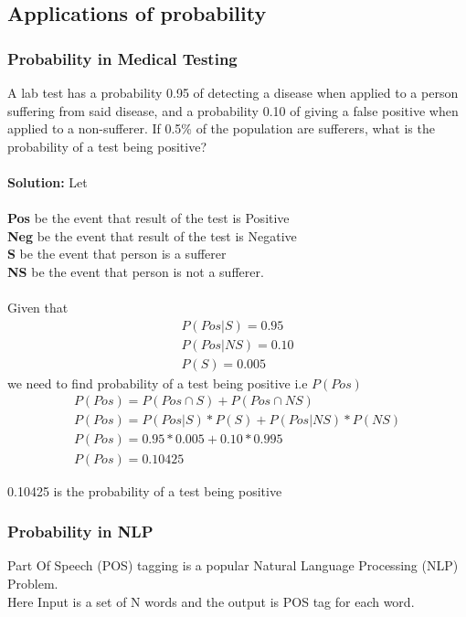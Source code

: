 \documentclass[12pt]{article}
\begin{document}
\subsection{Applications of probability}\subsubsection{Probability in Medical Testing}
A lab test has a probability 0.95 of detecting a disease when applied to a person suffering from said disease, and a probability 0.10 of giving a false positive when applied to a non-sufferer. If 0.5\% of the population are sufferers, what is the probability of a test being positive?\\ \\
\textbf{Solution:}
Let \\ \\
\textbf{Pos} be the event that result of the test is Positive\\ \textbf{Neg} be the event that result of the test is Negative\\
\textbf{S} be the event that person is a sufferer \\ 
\textbf{NS} be the event that person is not a sufferer. \\ \\
Given that
\begin{gather*}
    P(Pos|S) = 0.95\\
    P(Pos|NS) = 0.10\\
    P(S) = 0.005
\end{gather*}
we need to find probability of a test being positive i.e $P(Pos)$
\begin{gather*}
    P(Pos) = P(Pos\cap S) + P(Pos\cap NS)\\
    P(Pos) = P(Pos|S)*P(S) + P(Pos|NS)*P(NS)\\
    P(Pos) = 0.95*0.005 + 0.10*0.995\\
    P(Pos) = 0.10425
\end{gather*}

0.10425 is the probability of a test being positive

\subsubsection{Probability in NLP}
Part Of Speech (POS) tagging is a popular Natural Language Processing (NLP) Problem.\\
Here Input is a set of N words and the output is POS tag for each word.
\end{document}
